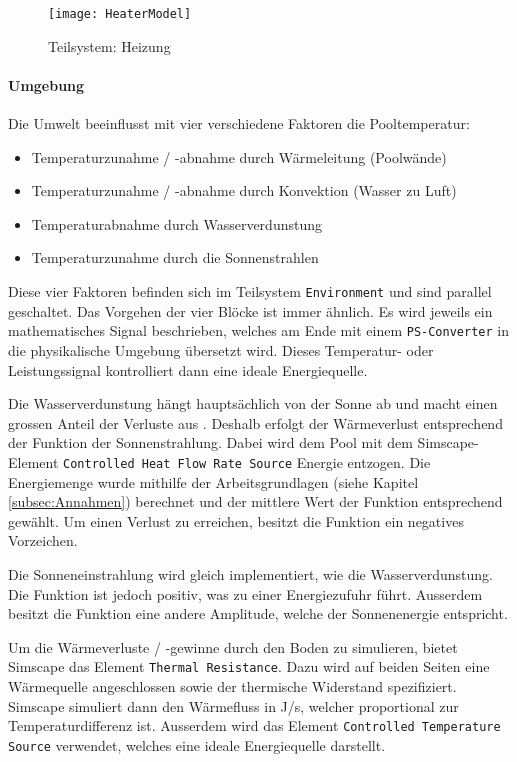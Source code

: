 \begin{figure}[H]
	\centering
	\texttt{[image: HeaterModel]}
	\caption{Teilsystem: Heizung}
	\label{fig:HeaterModel}
\end{figure}

\vspace{0.5cm}
\paragraph{Umgebung}
Die Umwelt beeinflusst mit vier verschiedene Faktoren die Pooltemperatur:

\begin{itemize}
	\item Temperaturzunahme / -abnahme durch Wärmeleitung (Poolwände)
	\item Temperaturzunahme / -abnahme durch Konvektion (Wasser zu Luft)
	\item Temperaturabnahme durch Wasserverdunstung
	\item Temperaturzunahme durch die Sonnenstrahlen
\end{itemize}

Diese vier Faktoren befinden sich im Teilsystem \texttt{Environment} und sind parallel geschaltet. Das Vorgehen der vier Blöcke ist immer ähnlich. Es wird jeweils ein mathematisches Signal beschrieben, welches am Ende mit einem \texttt{PS-Converter} in die physikalische Umgebung übersetzt wird. Dieses Temperatur- oder Leistungssignal kontrolliert dann eine ideale Energiequelle.

Die Wasserverdunstung hängt hauptsächlich von der Sonne ab und macht einen grossen Anteil der Verluste aus \cite{WasserVerdunsten}. Deshalb erfolgt der Wärmeverlust entsprechend der Funktion der Sonnenstrahlung. Dabei wird dem Pool mit dem Simscape-Element \texttt{Controlled Heat Flow Rate Source} Energie entzogen. Die Energiemenge wurde mithilfe der Arbeitsgrundlagen (siehe Kapitel \ref{subsec:Annahmen}) berechnet und der mittlere Wert der Funktion entsprechend gewählt. Um einen Verlust zu erreichen, besitzt die Funktion ein negatives Vorzeichen.

Die Sonneneinstrahlung wird gleich implementiert, wie die Wasserverdunstung. Die Funktion ist jedoch positiv, was zu einer Energiezufuhr führt. Ausserdem besitzt die Funktion eine andere Amplitude, welche der Sonnenenergie entspricht.

Um die Wärmeverluste / -gewinne durch den Boden zu simulieren, bietet Simscape das Element \texttt{Thermal Resistance}. Dazu wird auf beiden Seiten eine Wärmequelle angeschlossen sowie der thermische Widerstand spezifiziert. Simscape simuliert dann den Wärmefluss in J/s, welcher proportional zur Temperaturdifferenz ist. Ausserdem wird das Element \texttt{Controlled Temperature Source} verwendet, welches eine ideale Energiequelle darstellt.

